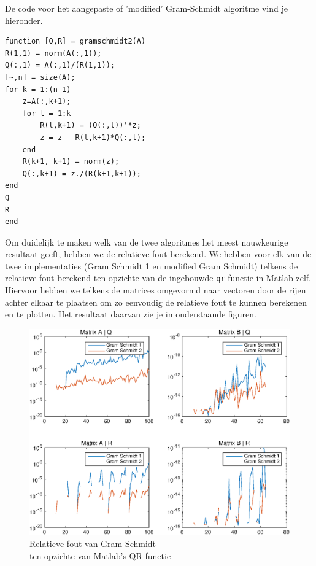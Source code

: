 \documentclass{article}
\begin{document}
De code voor het aangepaste of 'modified' Gram-Schmidt algoritme vind je hieronder.
\vspace{-5mm}
\begin{lstlisting}
function [Q,R] = gramschmidt2(A)
R(1,1) = norm(A(:,1));
Q(:,1) = A(:,1)/(R(1,1));
[~,n] = size(A);
for k = 1:(n-1)
    z=A(:,k+1);
    for l = 1:k
        R(l,k+1) = (Q(:,l))'*z;
        z = z - R(l,k+1)*Q(:,l);
    end
    R(k+1, k+1) = norm(z);
    Q(:,k+1) = z./(R(k+1,k+1));
end
Q
R
end
\end{lstlisting}

Om duidelijk te maken welk van de twee algoritmes het meest nauwkeurige resultaat geeft, hebben we de relatieve fout berekend. We hebben voor elk van de twee implementaties (Gram Schmidt 1 en modified Gram Schmidt) telkens de relatieve fout berekend ten opzichte van de ingebouwde \texttt{qr}-functie in Matlab zelf. Hiervoor hebben we telkens de matrices omgevormd naar vectoren door de rijen achter elkaar te plaatsen om zo eenvoudig de relatieve fout te kunnen berekenen en te plotten. Het resultaat daarvan zie je in onderstaande figuren.
\begin{figure}[H]
\centering
    \includegraphics[width=\linewidth]{GramSchmidtRelError} 
    \caption{Relatieve fout van Gram Schmidt\\ten opzichte van Matlab's QR functie}
\end{figure}
\end{document}

